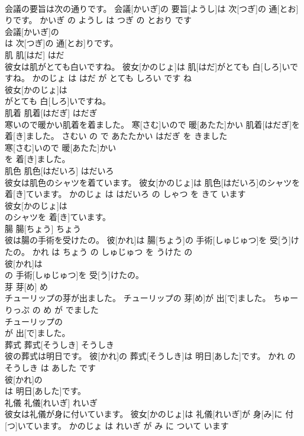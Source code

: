 \documentclass[8pt]{extreport}
\begin{document}
\begin{CJK}{UTF8}{min}
\\	会議の要旨は次の通りです。	会議[かいぎ]の 要旨[ようし]は 次[つぎ]の 通[とお]りです。	かいぎ の ようし は つぎ の とおり です	
\\	会議[かいぎ]の
\\	は 次[つぎ]の 通[とお]りです。			
\\	肌	肌[はだ]	はだ	
\\	彼女は肌がとても白いですね。	彼女[かのじょ]は 肌[はだ]がとても 白[しろ]いですね。	かのじょ は はだ が とても しろい です ね	
\\	彼女[かのじょ]は
\\	がとても 白[しろ]いですね。			
\\	肌着	肌着[はだぎ]	はだぎ	
\\	寒いので暖かい肌着を着ました。	寒[さむ]いので 暖[あたた]かい 肌着[はだぎ]を 着[き]ました。	さむい の で あたたかい はだぎ を きました	
\\	寒[さむ]いので 暖[あたた]かい
\\	を 着[き]ました。			
\\	肌色	肌色[はだいろ]	はだいろ	
\\	彼女は肌色のシャツを着ています。	彼女[かのじょ]は 肌色[はだいろ]のシャツを 着[き]ています。	かのじょ は はだいろ の しゃつ を きて います	
\\	彼女[かのじょ]は
\\	のシャツを 着[き]ています。			
\\	腸	腸[ちょう]	ちょう	
\\	彼は腸の手術を受けたの。	彼[かれ]は 腸[ちょう]の 手術[しゅじゅつ]を 受[う]けたの。	かれ は ちょう の しゅじゅつ を うけた の	
\\	彼[かれ]は
\\	の 手術[しゅじゅつ]を 受[う]けたの。			
\\	芽	芽[め]	め	
\\	チューリップの芽が出ました。	チューリップの 芽[め]が 出[で]ました。	ちゅーりっぷ の め が でました	
\\	チューリップの
\\	が 出[で]ました。			
\\	葬式	葬式[そうしき]	そうしき	
\\	彼の葬式は明日です。	彼[かれ]の 葬式[そうしき]は 明日[あした]です。	かれ の そうしき は あした です	
\\	彼[かれ]の
\\	は 明日[あした]です。			
\\	礼儀	礼儀[れいぎ]	れいぎ	
\\	彼女は礼儀が身に付いています。	彼女[かのじょ]は 礼儀[れいぎ]が 身[み]に 付[つ]いています。	かのじょ は れいぎ が み に ついて います	

\end{CJK}
\end{document}
